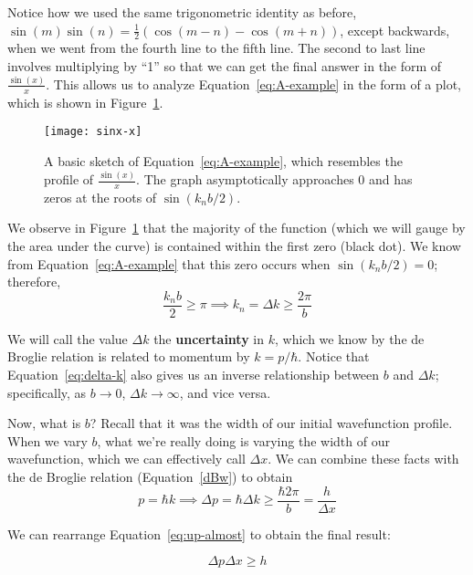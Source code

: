 Notice how we used the same trigonometric identity as before, $\sin(m)\sin(n) = \frac{1}{2}(\cos(m-n) - \cos(m+n))$, except backwards, when we went from the fourth line to the fifth line. The second to last line involves multiplying by ``1'' so that we can get the final answer in the form of $\frac{\sin(x)}{x}$. This allows us to analyze Equation~\ref{eq:A-example} in the form of a plot, which is shown in Figure~\ref{fig:sinx/x}.

\begin{figure}[!h]
	\centering
	\texttt{[image: sinx-x]}
	\caption{A basic sketch of Equation~\ref{eq:A-example}, which resembles the profile of $\frac{\sin(x)}{x}$. The graph asymptotically approaches 0 and has zeros at the roots of $\sin(k_nb/2)$.}
	\label{fig:sinx/x}
\end{figure}

We observe in Figure~\ref{fig:sinx/x} that the majority of the function (which we will gauge by the area under the curve) is contained within the first zero (black dot). We know from Equation~\ref{eq:A-example} that this zero occurs when $\sin(k_nb/2)=0$; therefore,
\begin{equation}
	\frac{k_nb}{2} \ge \pi \implies k_n = \Delta k \ge \frac{2\pi}{b} \label{eq:delta-k}
\end{equation}

We will call the value $\Delta k$ the \textbf{uncertainty} in $k$, which we know by the de Broglie relation is related to momentum by $k=p/\hbar$. Notice that Equation~\ref{eq:delta-k} also gives us an inverse relationship between $b$ and $\Delta k$; specifically, as $b \rightarrow 0$, $\Delta k \rightarrow \infty$, and vice versa. \par 

Now, what is $b$? Recall that it was the width of our initial wavefunction profile. When we vary $b$, what we're really doing is varying the width of our wavefunction, which we can effectively call $\Delta x$. We can combine these facts with the de Broglie relation (Equation~\ref{dBw}) to obtain
\begin{equation}
	p = \hbar k \implies \Delta p = \hbar \Delta k \ge  \frac{\hbar 2\pi}{b} = \frac{h}{\Delta x} \label{eq:up-almost}
\end{equation}

We can rearrange Equation~\ref{eq:up-almost} to obtain the final result:
\begin{tcolorbox}[title = Uncertainty principle] \vspace{-2ex}
	\begin{equation}
		\Delta p \Delta x \ge h \label{eq:up}
	\end{equation}
\end{tcolorbox}

